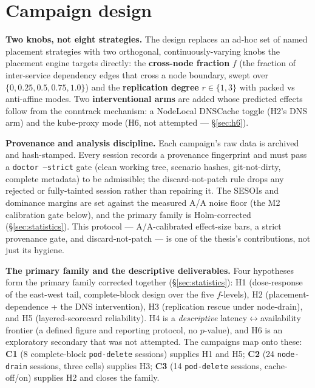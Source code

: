 \section{Campaign design}\label{sec:campaign}

\textbf{Two knobs, not eight strategies.} The design replaces an ad-hoc set of
named placement strategies with two orthogonal, continuously-varying knobs the
placement engine targets directly: the \textbf{cross-node fraction} $f$ (the
fraction of inter-service dependency edges that cross a node boundary, swept
over $\{0, 0.25, 0.5, 0.75, 1.0\}$) and the \textbf{replication degree} $r \in
\{1, 3\}$ with packed vs anti-affine modes. Two \textbf{interventional arms} are
added whose predicted effects follow from the conntrack mechanism: a NodeLocal
DNSCache toggle (H2's DNS arm) and the kube-proxy mode (H6, not attempted ---
\S\ref{sec:h6}).

\textbf{Provenance and analysis discipline.} Each campaign's raw data is
archived and hash-stamped. Every session records a provenance fingerprint and
must pass a \texttt{doctor --strict} gate (clean working tree, scenario hashes,
git-not-dirty, complete metadata) to be admissible; the discard-not-patch rule
drops any rejected or fully-tainted session rather than repairing it. The SESOIs
and dominance margins are set against the measured A/A noise floor
(the M2 calibration gate below), and the primary family is Holm-corrected
(\S\ref{sec:statistics}). This protocol --- A/A-calibrated effect-size bars, a
strict provenance gate, and discard-not-patch --- is one of the thesis's
contributions, not just its hygiene.

\textbf{The primary family and the descriptive deliverables.} Four
hypotheses form the primary family corrected together (\S\ref{sec:statistics}):
H1 (dose-response of the east-west tail, complete-block design over the five
$f$-levels), H2 (placement-dependence + the DNS intervention), H3 (replication
rescue under node-drain), and H5 (layered-scorecard reliability). H4 is a
\emph{descriptive} latency$\leftrightarrow$availability frontier (a defined
figure and reporting protocol, no $p$-value), and H6 is an exploratory secondary
that was not attempted. The campaigns map onto these: \textbf{C1} (8
complete-block \texttt{pod-delete} sessions) supplies H1 and H5; \textbf{C2} (24
\texttt{node-drain} sessions, three cells) supplies H3; \textbf{C3} (14
\texttt{pod-delete} sessions, cache-off/on) supplies H2 and closes the family.

